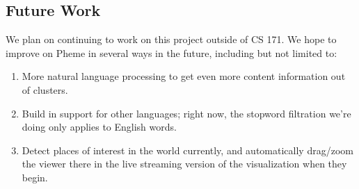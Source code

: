 \documentclass[pdftex,12pt,a4paper]{article}
\begin{document}
\subsection{Future Work}
We plan on continuing to work on this project outside of CS 171. We hope to improve on Pheme in several ways in the future, including but not limited to:
\begin{enumerate}
\item More natural language processing to get even more content information out of clusters. 
\item Build in support for other languages; right now, the stopword filtration we're doing only applies to English words.
\item Detect places of interest in the world currently, and automatically drag/zoom the viewer there in the live streaming version of the visualization when they begin.
\end{enumerate} 
\end{document}
